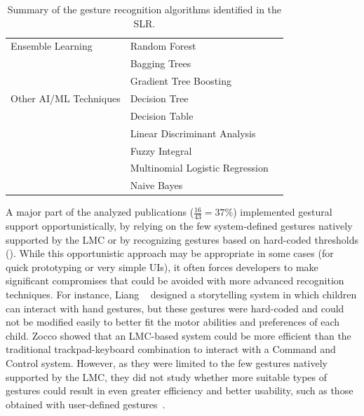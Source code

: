 \begin{table}[hbt]
{\begin{tabular}{lll}
        \midrule
        Ensemble Learning & Random Forest & \cite{Marin:2016,Schioppo:2019} \\
         & Bagging Trees & \cite{Jiang:2018} \\
         & Gradient Tree Boosting & \cite{Kiselev:2019} \\
        \midrule
        Other AI/ML Techniques & Decision Tree & \cite{Filho:2018,Stinghen:2018,Zhou:2018b} \\
         & Decision Table & \cite{Li:2017c} \\
         & Linear Discriminant Analysis & \cite{Jiang:2018} \\
         & Fuzzy Integral & \cite{Li:2017c} \\
         & Multinomial Logistic Regression & \cite{Kiselev:2019} \\
         & Naive Bayes & \cite{Preventis:2014} \\
        \bottomrule
    \end{tabular}
    }
    \caption{Summary of the gesture recognition algorithms identified in the SLR.}
    \label{tbl:state_of_the_art:lmc:algorithms}
\end{table}

A major part of the analyzed publications ($\frac{16}{43}{=}37\%$) implemented gestural support opportunistically, \ie by relying on the few system-defined gestures natively supported by the LMC or by recognizing gestures based on hard-coded thresholds (\eg \cite{Cai:2019,Galea:2018,Zhou:2018b}). While this opportunistic approach may be appropriate in some cases (\eg for quick prototyping\cite{Anthony:2012} or very simple UIs), it often forces developers to make significant compromises that could be avoided with more advanced recognition techniques. For instance, Liang \etal~\cite{Liang:2017} designed a storytelling system in which children can interact with hand gestures, but these gestures were hard-coded and could not be modified easily to better fit the motor abilities and preferences of each child. Zocco \etal\cite{Zocco:2015} showed that an LMC-based system could be more efficient than the traditional trackpad-keyboard combination to interact with a Command and Control system. However, as they were limited to the few gestures natively supported by the LMC, they did not study whether more suitable types of gestures could result in even greater efficiency and better usability, such as those obtained with user-defined gestures~\cite{Grijincu:2014}.

